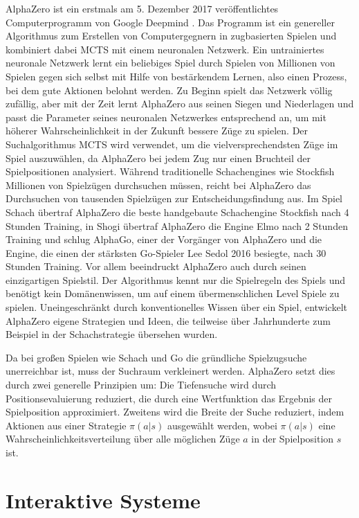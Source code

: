 AlphaZero ist ein erstmals am 5. Dezember 2017 veröffentlichtes Computerprogramm von Google Deepmind \cite{2017.AlphaZero}. Das Programm ist ein genereller Algorithmus zum Erstellen von Computergegnern in zugbasierten Spielen und kombiniert dabei \ac{MCTS} mit einem neuronalen Netzwerk. Ein untrainiertes neuronale Netzwerk lernt ein beliebiges Spiel durch Spielen von Millionen von Spielen gegen sich selbst mit Hilfe von bestärkendem Lernen, also einen Prozess, bei dem gute Aktionen belohnt werden. Zu Beginn spielt das Netzwerk völlig zufällig, aber mit der Zeit lernt AlphaZero aus seinen Siegen und Niederlagen und passt die Parameter seines neuronalen Netzwerkes entsprechend an, um mit höherer Wahrscheinlichkeit in der Zukunft bessere Züge zu spielen. Der Suchalgorithmus \ac{MCTS} wird verwendet, um die vielversprechendsten Züge im Spiel auszuwählen, da AlphaZero bei jedem Zug nur einen Bruchteil der Spielpositionen analysiert. Während traditionelle Schachengines wie Stockfish Millionen von Spielzügen durchsuchen müssen, reicht bei AlphaZero das Durchsuchen von tausenden Spielzügen zur Entscheidungsfindung aus. Im Spiel Schach übertraf AlphaZero die beste handgebaute Schachengine Stockfish nach 4 Stunden Training, in Shogi übertraf AlphaZero die Engine Elmo nach 2 Stunden Training und schlug AlphaGo, einer der Vorgänger von AlphaZero und die Engine, die einen der stärksten Go-Spieler Lee Sedol 2016 besiegte, nach 30 Stunden Training. Vor allem beeindruckt AlphaZero auch durch seinen einzigartigen Spielstil. Der Algorithmus kennt nur die Spielregeln des Spiels und benötigt kein Domänenwissen, um auf einem übermenschlichen Level Spiele zu spielen. Uneingeschränkt durch konventionelles Wissen über ein Spiel, entwickelt AlphaZero eigene Strategien und Ideen, die teilweise über Jahrhunderte zum Beispiel in der Schachstrategie übersehen wurden. \cite{2018.AlphaZero}

Da bei großen Spielen wie Schach und Go die gründliche Spielzugsuche unerreichbar ist, muss der Suchraum verkleinert werden. AlphaZero setzt dies durch zwei generelle Prinzipien um: Die Tiefensuche wird durch Positionsevaluierung reduziert, die durch eine Wertfunktion das Ergebnis der Spielposition approximiert. Zweitens wird die Breite der Suche reduziert, indem Aktionen aus einer Strategie $\pi(a|s)$ ausgewählt werden, wobei $\pi(a|s)$ eine Wahrscheinlichkeitsverteilung über alle möglichen Züge $a$ in der Spielposition $s$ ist. \cite{2016.AlphaGoPaper}

\section{Interaktive Systeme}
\label{chapter:interaktive-systeme}

